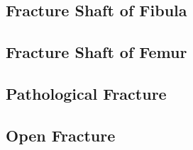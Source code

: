 \documentclass[11pt, a4paper]{article}
\begin{document}
\subsection{Fracture Shaft of Fibula}
\label{subsec:fractureShaftFibula}
\subsection{Fracture Shaft of Femur}
\label{subsec:fractureShaftFemur}
\subsection{Pathological Fracture}
\label{subsec:pathologicalFracture}
\subsection{Open Fracture}
\label{subsec:openFracture}
\end{document}
